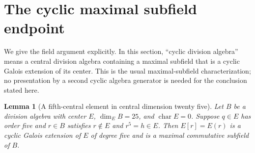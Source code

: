 \documentclass[11pt,letterpaper]{article}
\newtheorem{lemma}[theorem]{Lemma}
\theoremstyle{definition}
\theoremstyle{remark}
\begin{document}
\section{The cyclic maximal subfield endpoint}\label{sec:endpoint}

We give the field argument explicitly. In this section, ``cyclic division
algebra'' means a central division algebra containing a maximal subfield
that is a cyclic Galois extension of its center. This is the usual
maximal-subfield characterization; no presentation by a second cyclic
algebra generator is needed for the conclusion stated here.

\begin{lemma}[A fifth-central element in central dimension twenty five]
\label{lem:endpoint}
Let $B$ be a division algebra with center $E$, $\dim_E B=25$, and
$\operatorname{char}E=0$. Suppose $q\in E$ has order five and $r\in B$
satisfies $r\notin E$ and $r^5=h\in E$. Then $E[r]=E(r)$ is a cyclic
Galois extension of $E$ of degree five and is a maximal commutative
subfield of $B$.
\end{lemma}
\end{document}
